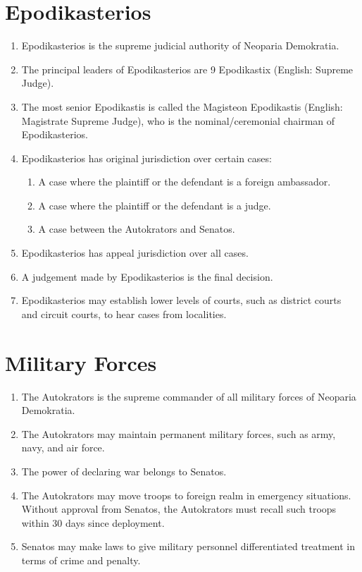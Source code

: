 \section{Epodikasterios}
\begin{enumerate}[start=401]
	\item Epodikasterios is the supreme judicial authority of Neoparia Demokratia.
	\item The principal leaders of Epodikasterios are 9 Epodikastix (English: Supreme Judge).
	\item The most senior Epodikastis is called the Magisteon Epodikastis (English: Magistrate Supreme Judge),
	      who is the nominal/ceremonial chairman of Epodikasterios.
	\item Epodikasterios has original jurisdiction over certain cases:
	      \begin{enumerate}
		      \item A case where the plaintiff or the defendant is a foreign ambassador.
		      \item A case where the plaintiff or the defendant is a judge.
		      \item A case between the Autokrators and Senatos.
	      \end{enumerate}
	\item Epodikasterios has appeal jurisdiction over all cases.
	\item A judgement made by Epodikasterios is the final decision.
	\item Epodikasterios may establish lower levels of courts, such as district courts and circuit courts,
	      to hear cases from localities.
\end{enumerate}





\section{Military Forces}
\begin{enumerate}[start=501]
	\item The Autokrators is the supreme commander of all military forces of Neoparia Demokratia.
	\item The Autokrators may maintain permanent military forces, such as army, navy, and air force.
	\item The power of declaring war belongs to Senatos.
	\item The Autokrators may move troops to foreign realm in emergency situations.
	      Without approval from Senatos, the Autokrators must recall such troops within 30 days since deployment.
	\item Senatos may make laws to give military personnel differentiated treatment in terms of crime and penalty.
\end{enumerate}






